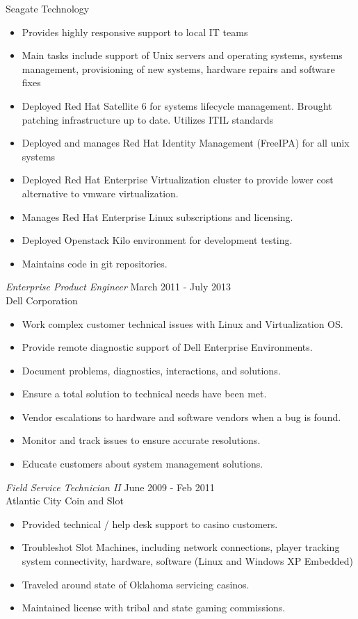 \documentclass[margin]{res}
\begin{document}
\begin{resume}
	Seagate Technology
	\begin{itemize}  \itemsep -2pt %
	\item Provides highly responsive support to local IT teams
	\item Main tasks include support of Unix servers and operating systems, systems management, provisioning of new systems, hardware repairs and software fixes
	\item Deployed Red Hat Satellite 6 for systems lifecycle management. Brought patching infrastructure up to date. Utilizes ITIL standards
	\item Deployed and manages Red Hat Identity Management (FreeIPA) for all unix systems
	\item Deployed Red Hat Enterprise Virtualization cluster to provide lower cost alternative to vmware virtualization.
	\item Manages Red Hat Enterprise Linux subscriptions and licensing.
	\item Deployed Openstack Kilo environment for development testing.
	\item Maintains code in git repositories.
	\end{itemize}
 	{\sl Enterprise Product Engineer} \hfill March 2011 - July 2013 \\
 	Dell Corporation
 	\begin{itemize}  \itemsep -2pt %
 		\item Work complex customer technical issues with Linux and Virtualization OS.
 		\item Provide remote diagnostic support of Dell Enterprise Environments.
 		\item Document problems, diagnostics, interactions, and solutions.
 		\item Ensure a total solution to technical needs have been met.
 		\item Vendor escalations to hardware and software vendors when a bug is found.
 		\item Monitor and track issues to ensure accurate resolutions.
 		\item Educate customers about system management solutions.
 	\end{itemize}
 	{\sl Field Service Technician II} \hfill June 2009 - Feb 2011 \\
 	Atlantic City Coin and Slot
 	\begin{itemize}  \itemsep -2pt %
 		\item Provided technical / help desk support to casino customers.
 		\item Troubleshot Slot Machines, including network connections, player tracking system connectivity, hardware, software (Linux and Windows XP Embedded)
 		\item Traveled around state of Oklahoma servicing casinos.
 		\item Maintained license with tribal and state gaming commissions.
 	\end{itemize} 	
\end{resume}
\end{document}
